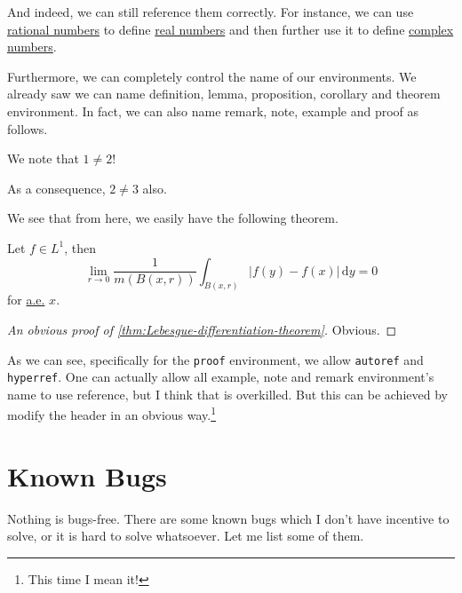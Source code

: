 \begin{note}
	And indeed, we can still reference them correctly. For instance, we can use \hyperref[def:rational]{rational numbers} to define \hyperref[def:real]{real numbers}
	and then further use it to define \hyperref[def:complex]{complex numbers}.
\end{note}

Furthermore, we can completely control the name of our environments. We already saw we can name definition, lemma, proposition, corollary and theorem environment.
In fact, we can also name remark, note, example and proof as follows.
\begin{eg}\label{eg}
	We note that \(1 \neq 2\)!
	\begin{note}
		As a consequence, \(2 \neq 3\) also.
	\end{note}

	\begin{remark}
		We see that from here, we easily have the following theorem.
		\begin{theorem}\label{thm:Lebesgue-differentiation-theorem}
			Let \(f\in L^1\), then
			\[
				\lim\limits_{r \to 0} \frac{1}{m(B(x, r))}\int_{B(x, r)}\left\vert f(y) - f(x) \right\vert   \,\mathrm{d}y = 0
			\]
			for \hyperref[def:mu-almost-everywhere]{a.e.} \(x\).
		\end{theorem}
		\begin{proof}[An obvious proof of \autoref{thm:Lebesgue-differentiation-theorem}]
			Obvious.
		\end{proof}
	\end{remark}
\end{eg}
As we can see, specifically for the \texttt{proof} environment, we allow \texttt{autoref} and \texttt{hyperref}. One can actually
allow all example, note and remark environment's name to use reference, but I think that is overkilled. But this can be achieved
by modify the header in an obvious way.\footnote{This time I mean it!}

\section{Known Bugs}
Nothing is bugs-free. There are some known bugs which I don't have incentive to solve, or it is hard to solve whatsoever. Let me list some of them.
